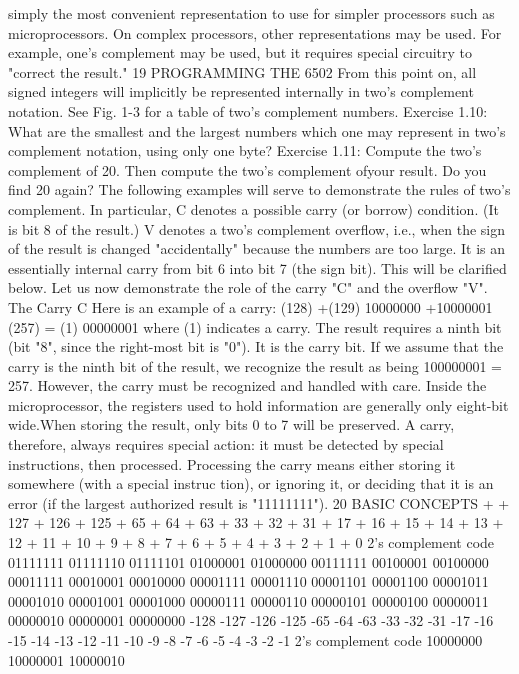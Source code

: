 simply the most convenient representation to use for simpler processors
such as microprocessors. On complex processors, other representations
may be used. For example, one's complement may be used, but it requires
special circuitry to "correct the result."
19
PROGRAMMING THE 6502
From this point on, all signed integers will implicitly be represented
internally in two's complement notation. See Fig. 1-3 for a table of
two's complement numbers.
Exercise 1.10: What are the smallest and the largest numbers which one
may represent in two's complement notation, using only one byte?
Exercise 1.11: Compute the two's complement of 20. Then compute the
two's complement ofyour result. Do you find 20 again?
The following examples will serve to demonstrate the rules of two's
complement. In particular, C denotes a possible carry (or borrow)
condition. (It is bit 8 of the result.)
V denotes a two's complement overflow, i.e., when the sign of the
result is changed "accidentally" because the numbers are too
large. It is an essentially internal carry from bit 6 into bit 7 (the
sign bit). This will be clarified below.
Let us now demonstrate the role of the carry "C" and the overflow
"V".
The Carry C
Here is an example of a carry:
(128)
+(129)
10000000
+10000001
(257) = (1) 00000001
where (1) indicates a carry.
The result requires a ninth bit (bit "8", since the right-most bit is
"0"). It is the carry bit.
If we assume that the carry is the ninth bit of the result, we
recognize the result as being 100000001 = 257.
However, the carry must be recognized and handled with care.
Inside the microprocessor, the registers used to hold information
are generally only eight-bit wide.When storing the result, only bits 0 to
7 will be preserved.
A carry, therefore, always requires special action: it must be
detected by special instructions, then processed. Processing the
carry means either storing it somewhere (with a special instruc
tion), or ignoring it, or deciding that it is an error (if the largest
authorized result is "11111111").
20
BASIC CONCEPTS
+
+ 127
+ 126
+ 125
+ 65
+ 64
+ 63
+ 33
+ 32
+ 31
+ 17
+ 16
+ 15
+ 14
+ 13
+ 12
+ 11
+ 10
+ 9
+ 8
+ 7
+ 6
+ 5
+ 4
+ 3
+ 2
+ 1
+ 0
2's complement
code
01111111
01111110
01111101
01000001
01000000
00111111
00100001
00100000
00011111
00010001
00010000
00001111
00001110
00001101
00001100
00001011
00001010
00001001
00001000
00000111
00000110
00000101
00000100
00000011
00000010
00000001
00000000
-128
-127
-126
-125
-65
-64
-63
-33
-32
-31
-17
-16
-15
-14
-13
-12
-11
-10
-9
-8
-7
-6
-5
-4
-3
-2
-1
2's complement
code
10000000
10000001
10000010
